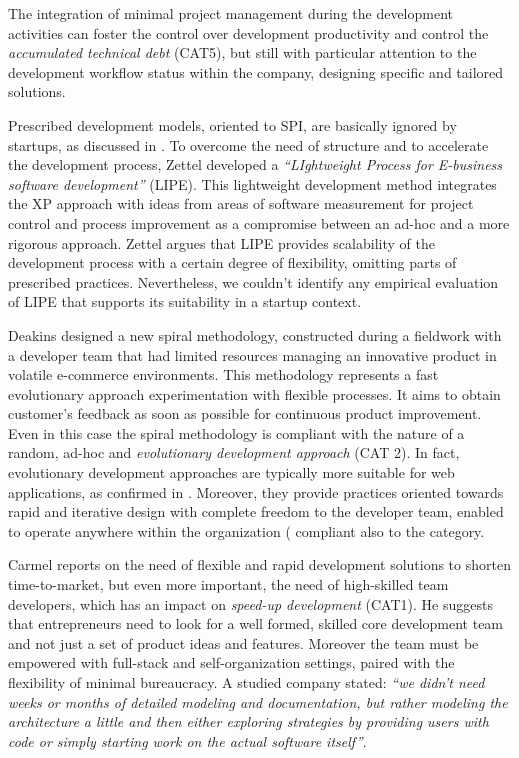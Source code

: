 \documentclass[10pt,journal,letterpaper,compsoc]{IEEEtran}
\begin{document}
The integration of minimal project management during the development activities 
can foster the control over development productivity and control the 
\textit{accumulated technical debt} (CAT5), but still with particular attention 
to the development workflow status within the company, designing specific and 
tailored solutions. 

Prescribed development models, oriented to SPI, are basically ignored by 
startups, as discussed in \cite{Zettel2001}. %
To overcome the need of structure and to accelerate the development process, 
Zettel developed a \textit{``LIghtweight Process for E-business software 
development''} (LIPE). This lightweight development method integrates the XP 
approach with ideas from areas of software measurement for project control and 
process improvement as a compromise between an ad-hoc and a more rigorous 
approach. Zettel argues that LIPE provides scalability of the development 
process with a certain degree of flexibility, omitting parts of prescribed 
practices. Nevertheless, we couldn't identify any empirical evaluation of LIPE 
that supports its suitability in a startup context.


Deakins \cite{Deakins2005} designed a new spiral methodology, constructed during a
fieldwork with a developer team that had limited resources managing an 
innovative product in volatile e-commerce environments. This methodology represents a fast 
evolutionary approach experimentation with flexible processes. It aims to obtain
customer's feedback as soon as possible for continuous product improvement.%
Even in this case the spiral methodology%
is compliant with the nature of a random, ad-hoc and \textit{evolutionary development approach} (CAT 2). In fact, evolutionary development approaches are typically more 
suitable  for web applications, as confirmed in \cite{Deshpande2001}.
Moreover, they provide practices oriented towards rapid and iterative design with complete freedom 
to the developer team, enabled to operate anywhere within the organization ( 
compliant also to the category.%

Carmel \cite{Camel1994a} reports on the need of flexible and rapid development 
solutions to shorten time-to-market, but even more important, the need of 
high-skilled team developers, which has an impact on \textit{speed-up 
development} (CAT1). He suggests that entrepreneurs need to look for a well 
formed, skilled core development team and not just a set of product ideas and 
features. Moreover the team must be empowered with full-stack and 
self-organization settings, paired with the flexibility of minimal bureaucracy. 
A studied company stated: \textit{``we didn't need weeks or months of detailed 
modeling and documentation, but rather modeling the architecture a little and 
then either exploring strategies by providing users with code or simply starting 
work on the actual software itself''}.
\end{document}
